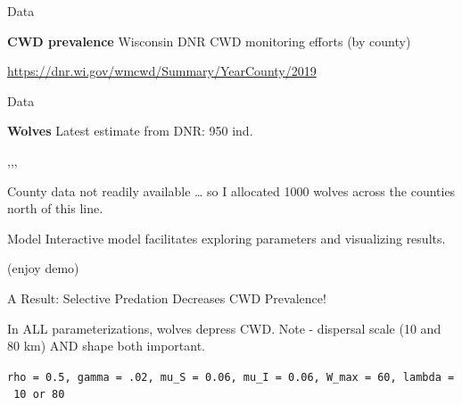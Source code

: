 \documentclass[
  11pt,
  ignorenonframetext,
  aspectratio=43]{beamer}
\begin{document}
\begin{frame}{Data}
\protect\hypertarget{data-1}{}
\begin{block}{\textbf{CWD prevalence}}
\protect\hypertarget{cwd-prevalence}{}
Wisconsin DNR CWD monitoring efforts (by county) \nd

\bc
{}
\ec

\small \url{https://dnr.wi.gov/wmcwd/Summary/YearCounty/2019}
\end{block}
\end{frame}

\begin{frame}{Data}
\protect\hypertarget{data-2}{}
\begin{block}{\textbf{Wolves}}
\protect\hypertarget{wolves}{}
Latest estimate from DNR: 950 ind.

\bc {} ,,,
 \ec

County data not readily available \ldots{} so I allocated 1000 wolves
across the counties north of this line.
\end{block}
\end{frame}

\begin{frame}{Model}
\protect\hypertarget{model}{}
Interactive model facilitates exploring parameters and visualizing
results.

\bc

(enjoy demo) \ec
\end{frame}

\begin{frame}[fragile]{A Result: Selective Predation Decreases CWD
Prevalence!}
\protect\hypertarget{a-result-selective-predation-decreases-cwd-prevalence}{}
\bc
{}
\ec

\small

In ALL parameterizations, wolves depress CWD. Note - dispersal scale (10
and 80 km) AND shape both important.

\footnotesize \texttt{rho\ =\ 0.5,\ gamma\ =\ .02,\ mu\_S\ =\ 0.06,\ mu\_I\ =\ 0.06,\ W\_max\ =\ 60,\ lambda\ =\ 10\ or\ 80}
\end{frame}
\end{document}
